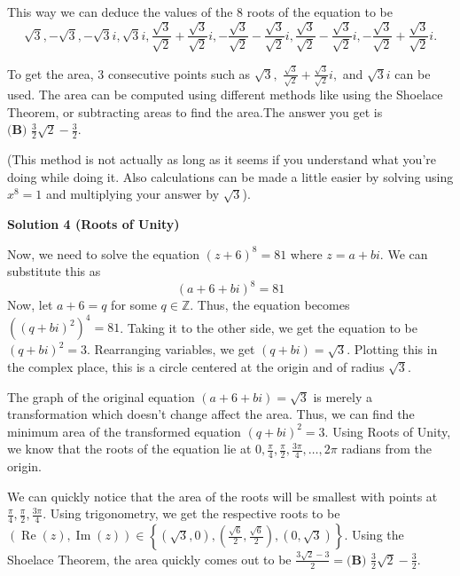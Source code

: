 \begin{enumerate}
 This way we can deduce the values of the $8$ roots of the equation to be 
 \[\sqrt{3},-\sqrt{3},-\sqrt{3}i,\sqrt{3}i,\frac{\sqrt{3}}{\sqrt{2}}+\frac{\sqrt{3}}{\sqrt{2}}i,-\frac{\sqrt{3}}{\sqrt{2}}-\frac{\sqrt{3}}{\sqrt{2}}i,\frac{\sqrt{3}}{\sqrt{2}}-\frac{\sqrt{3}}{\sqrt{2}}i,-\frac{\sqrt{3}}{\sqrt{2}}+\frac{\sqrt{3}}{\sqrt{2}}i.\]

 To get the area, $3$ consecutive points such as $\sqrt{3},$ $\frac{\sqrt{3}}{\sqrt{2}}+\frac{\sqrt{3}}{\sqrt{2}}i,$ and $\sqrt{3}i$ can be used. The area can be computed using different methods like using the Shoelace Theorem, or subtracting areas to find the area.The answer you get is $\boxed{\textbf{(B) } \frac{3}{2}\sqrt{2}-\frac{3}{2}}$.

 (This method is not actually as long as it seems if you understand what you're doing while doing it. Also calculations can be made a little easier by solving using $x^8=1$ and multiplying your answer by $\sqrt{3}$).

 



\textbf{Solution 4 (Roots of Unity)}

Now, we need to solve the equation $(z+6)^8 = 81$ where $z = a+bi$. We can substitute this as 
 \[(a+6+bi)^8 = 81\] Now, let $a+6 = q$ for some $q \in \mathbb{Z}$. Thus, the equation becomes $((q+bi)^2)^4 = 81$. Taking it to the other side, we get the equation to be $(q+bi)^2 = 3$. Rearranging variables, we get $(q+bi) = \sqrt{3}$. Plotting this in the complex place, this is a circle centered at the origin and of radius $\sqrt{3}$. 

 The graph of the original equation $(a+6+bi) = \sqrt{3}$ is merely a transformation which doesn't change affect the area. Thus, we can find the minimum area of the transformed equation $(q+bi)^2 = 3$. Using Roots of Unity, we know that the roots of the equation lie at $0, \frac{\pi}{4}, \frac{\pi}{2}, \frac{3\pi}{4}, \ldots, 2\pi$ radians from the origin. 

 We can quickly notice that the area of the roots will be smallest with points at $\frac{\pi}{4}, \frac{\pi}{2}, \frac{3\pi}{4}$. Using trigonometry, we get the respective roots to be $(\operatorname{Re}(z), \operatorname{Im}(z)) \in \left\{\left(\sqrt{3},0\right), \left(\frac{\sqrt{6}}{2}, \frac{\sqrt{6}}{2}\right), \left(0,\sqrt{3}\right)\right\}$. Using the Shoelace Theorem, the area quickly comes out to be $\frac{3\sqrt{2}-3}{2} = \boxed{\textbf{(B) } \frac{3}{2}\sqrt{2}-\frac{3}{2}}.$





\end{enumerate}
